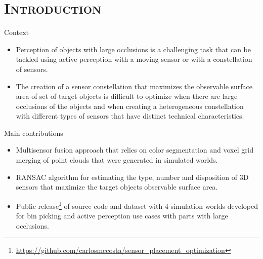 \section{\scshape Introduction}\label{sec:introduction}

\begin{frame}{Context}
	\begin{itemize}
		\item Perception of objects with large occlusions is a challenging task that can be tackled using active perception with a moving sensor or with a constellation of sensors.
		\item The creation of a sensor constellation that maximizes the observable surface area of set of target objects is difficult to optimize when there are large occlusions of the objects and when creating a heterogeneous constellation with different types of sensors that have distinct technical characteristics.
	\end{itemize}
\end{frame}


\begin{frame}{Main contributions}
	\begin{itemize}
		\item Multisensor fusion approach that relies on color segmentation and voxel grid merging of point clouds that were generated in simulated worlds.
		\item RANSAC algorithm for estimating the type, number and disposition of 3D sensors that maximize the target objects observable surface area.
		\item Public release\footnote{\scriptsize\url{https://github.com/carlosmccosta/sensor_placement_optimization}} of source code and dataset with 4 simulation worlds developed for bin picking and active perception use cases with parts with large occlusions.
	\end{itemize}
\end{frame}
